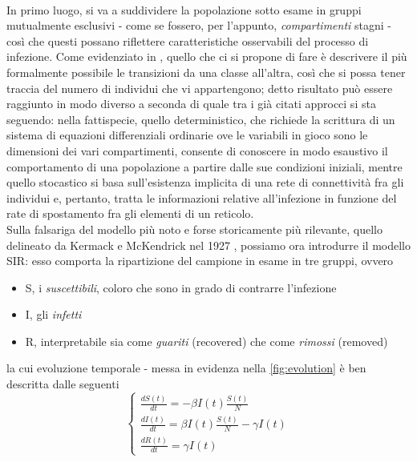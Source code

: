 \cite{Li} 
\\ In primo luogo, si va a suddividere la popolazione sotto esame in gruppi mutualmente esclusivi - come se fossero, per l'appunto, \emph{compartimenti} stagni - così che questi possano riflettere caratteristiche osservabili del processo di infezione. Come evidenziato in \cite{Kiss}, quello che ci si propone di fare è descrivere il più formalmente possibile le transizioni da una classe all'altra, così che si possa tener traccia del numero di individui che vi appartengono; detto risultato può essere raggiunto in modo diverso a seconda di quale tra i già citati approcci si sta seguendo: 
nella fattispecie, quello deterministico, che richiede la scrittura di un sistema di equazioni differenziali ordinarie ove le variabili in gioco sono le dimensioni dei vari compartimenti, consente di conoscere in modo esaustivo il comportamento di una popolazione a partire dalle sue condizioni iniziali, mentre quello stocastico si basa sull'esistenza implicita di una rete di connettività fra gli individui e, pertanto, tratta le informazioni relative all'infezione in funzione del rate di spostamento fra gli elementi di un reticolo.
\\
Sulla falsariga del modello più noto e forse storicamente più rilevante, quello delineato da Kermack e McKendrick nel 1927 \cite{Kermack}, possiamo ora introdurre il modello SIR: esso comporta la ripartizione del campione in esame in tre gruppi, ovvero
\begin{itemize}
\item S, i \emph{suscettibili}, coloro che sono in grado di contrarre l'infezione
\item I, gli \emph{infetti}
\item R, interpretabile sia come \emph{guariti} (recovered) che come \emph{rimossi} (removed)
\end{itemize}
la cui evoluzione temporale - messa in evidenza nella \cref{fig:evolution} è ben descritta dalle seguenti
\begin{equation}
\begin{cases}
\frac{dS(t)}{dt} = - \beta I(t) \frac{S(t)}{N} \\
\frac{dI(t)}{dt} = \beta I(t) \frac{S(t)}{N} - \gamma I(t) \\
\frac{dR(t)}{dt} = \gamma I(t)
\end{cases} 
\label{SIR}
\end{equation}
